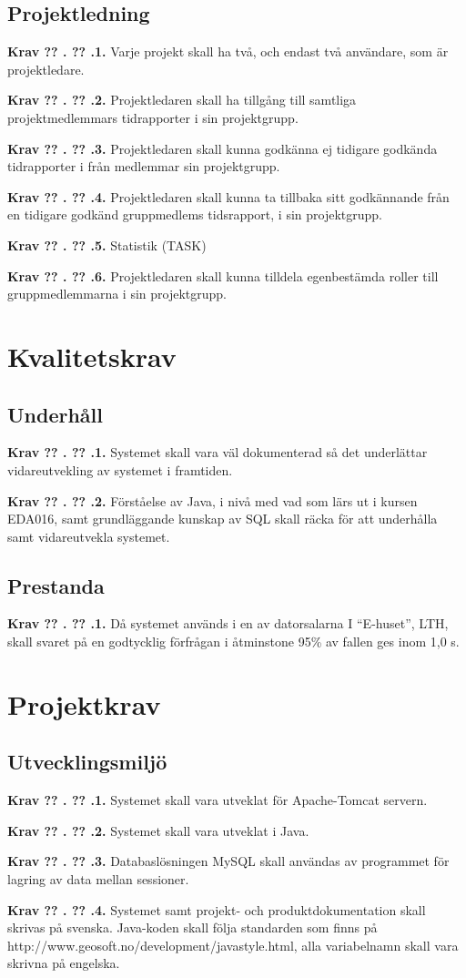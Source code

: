 \documentclass[a4paper]{article}
\newcommand\getcurrentref[1]{%
 \ifnumequal{\value{#1}}{0}
  {??}
  {\the\value{#1}}%
}
\newcommand\requirement[2]{
	\numberedrow{Krav}{#1}{#2}
}
\newcommand\numberedrow[3]{
	\noindent
	\textbf{#1 \getcurrentref{section}.\getcurrentref{subsection}.#2.} #3
	
}
\begin{document}



\subsection{Projektledning}
\requirement{1}{Varje projekt skall ha två, och endast två användare, som är projektledare.}
\requirement{2}{Projektledaren skall ha tillgång till samtliga projektmedlemmars tidrapporter i sin projektgrupp.}
\requirement{3}{Projektledaren skall kunna godkänna ej tidigare godkända tidrapporter i från medlemmar sin projektgrupp.}
\requirement{4}{Projektledaren skall kunna ta tillbaka sitt godkännande från en tidigare godkänd gruppmedlems tidsrapport, i sin projektgrupp.}
\requirement{5}{Statistik (TASK)}
\requirement{6}{Projektledaren skall kunna tilldela egenbestämda roller till gruppmedlemmarna i sin projektgrupp.}

\section{Kvalitetskrav}
\subsection{Underhåll}
\requirement{1}{Systemet skall vara väl dokumenterad så det underlättar vidareutvekling av systemet i framtiden.}
\requirement{2}{Förståelse av Java, i nivå med vad som lärs ut i kursen EDA016, samt grundläggande kunskap av SQL skall räcka för att underhålla samt vidareutvekla systemet.}
\subsection{Prestanda}
\requirement{1}{Då systemet används i en av datorsalarna I “E-huset”, LTH, skall svaret på en godtycklig förfrågan i åtminstone 95\% av fallen ges inom 1,0 s.}
\section{Projektkrav}
\subsection{Utvecklingsmiljö}
\requirement{1}{Systemet skall vara utveklat för Apache-Tomcat servern.}
\requirement{2}{Systemet skall vara utveklat i Java.}
\requirement{3}{Databaslösningen MySQL skall användas av programmet för lagring av data mellan sessioner.}
\requirement{4}{Systemet samt projekt- och produktdokumentation skall skrivas på svenska. Java-koden skall följa standarden som finns på http://www.geosoft.no/development/javastyle.html, alla variabelnamn skall vara skrivna på engelska.}
\end{document}
